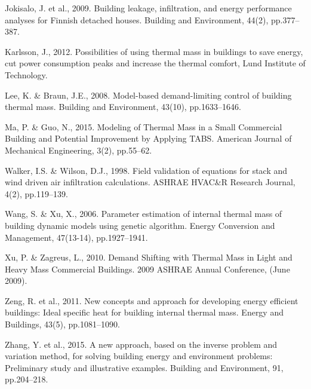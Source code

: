 Jokisalo, J. et al., 2009. Building leakage, infiltration, and energy performance analyses for Finnish detached houses. Building and Environment, 44(2), pp.377–387.

Karlsson, J., 2012. Possibilities of using thermal mass in buildings to save energy, cut power consumption peaks and increase the thermal comfort, Lund Institute of Technology.

Lee, K. \& Braun, J.E., 2008. Model-based demand-limiting control of building thermal mass. Building and Environment, 43(10), pp.1633–1646.

Ma, P. \& Guo, N., 2015. Modeling of Thermal Mass in a Small Commercial Building and Potential Improvement by Applying TABS. American Journal of Mechanical Engineering, 3(2), pp.55–62.

Walker, I.S. \& Wilson, D.J., 1998. Field validation of equations for stack and wind driven air infiltration calculations. ASHRAE HVAC\&R Research Journal, 4(2), pp.119–139.

Wang, S. \& Xu, X., 2006. Parameter estimation of internal thermal mass of building dynamic models using genetic algorithm. Energy Conversion and Management, 47(13-14), pp.1927–1941.

Xu, P. \& Zagreus, L., 2010. Demand Shifting with Thermal Mass in Light and Heavy Mass Commercial Buildings. 2009 ASHRAE Annual Conference, (June 2009).

Zeng, R. et al., 2011. New concepts and approach for developing energy efficient buildings: Ideal specific heat for building internal thermal mass. Energy and Buildings, 43(5), pp.1081–1090.

Zhang, Y. et al., 2015. A new approach, based on the inverse problem and variation method, for solving building energy and environment problems: Preliminary study and illustrative examples. Building and Environment, 91, pp.204–218.
